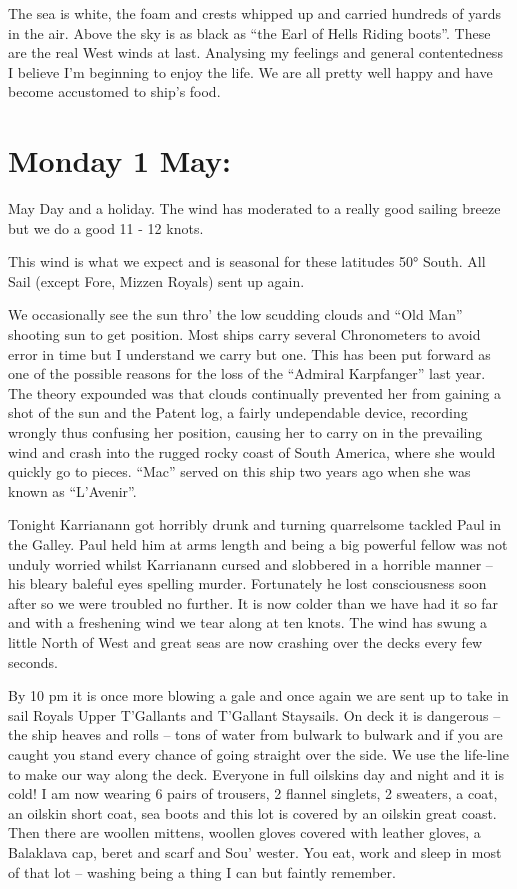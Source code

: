 \documentclass[
  11pt,
  msmallroyalvopaper
]{memoir}
\begin{document}
The sea is white, the foam and crests whipped up and carried hundreds of
yards in the air. Above the sky is as black as ``the Earl of Hells
Riding boots''. These are the real West winds at last. Analysing my
feelings and general contentedness I believe I'm beginning to enjoy the
life. We are all pretty well happy and have become accustomed to ship's
food.

\hypertarget{monday-1-may}{%
\section{Monday 1 May:}\label{monday-1-may}}

May Day and a holiday. The wind has moderated to a really good sailing
breeze but we do a good 11 - 12 knots.

This wind is what we expect and is seasonal for these latitudes 50°
South. All Sail (except Fore, Mizzen Royals) sent up again.

We occasionally see the sun thro' the low scudding clouds and ``Old
Man'' shooting sun to get position. Most ships carry several
Chronometers to avoid error in time but I understand we carry but one.
This has been put forward as one of the possible reasons for the loss of
the ``Admiral Karpfanger'' last year. The theory expounded was that
clouds continually prevented her from gaining a shot of the sun and the
Patent log, a fairly undependable device, recording wrongly thus
confusing her position, causing her to carry on in the prevailing wind
and crash into the rugged rocky coast of South America, where she would
quickly go to pieces. ``Mac'' served on this ship two years ago when she
was known as ``L'Avenir''.

Tonight Karrianann got horribly drunk and turning quarrelsome tackled
Paul in the Galley. Paul held him at arms length and being a big
powerful fellow was not unduly worried whilst Karrianann cursed and
slobbered in a horrible manner -- his bleary baleful eyes spelling
murder. Fortunately he lost consciousness soon after so we were troubled
no further. It is now colder than we have had it so far and with a
freshening wind we tear along at ten knots. The wind has swung a little
North of West and great seas are now crashing over the decks every few
seconds.

By 10 pm it is once more blowing a gale and once again we are sent up to
take in sail Royals Upper T'Gallants and T'Gallant Staysails. On deck it
is dangerous -- the ship heaves and rolls -- tons of water from bulwark
to bulwark and if you are caught you stand every chance of going
straight over the side. We use the life-line to make our way along the
deck. Everyone in full oilskins day and night and it is cold! I am now
wearing 6 pairs of trousers, 2 flannel singlets, 2 sweaters, a coat, an
oilskin short coat, sea boots and this lot is covered by an oilskin
great coast. Then there are woollen mittens, woollen gloves covered with
leather gloves, a Balaklava cap, beret and scarf and Sou' wester. You
eat, work and sleep in most of that lot -- washing being a thing I can
but faintly remember.
\end{document}
